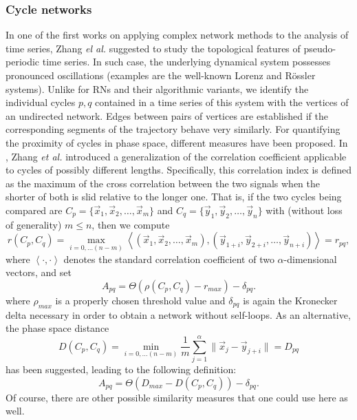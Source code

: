 		\subsubsection{Cycle networks}
In one of the first works on applying complex network methods to the analysis of time series, Zhang {\textit{el al.}} \cite{Zhang2006} suggested to study the topological features of pseudo-periodic time series. In such case, the underlying dynamical system possesses pronounced oscillations (examples are the well-known Lorenz and R\"ossler systems). Unlike for RNs and their algorithmic variants, we identify the individual cycles $p,q$ contained in a time series of this system with the vertices of an undirected network. Edges between pairs of vertices are established if the corresponding segments of the trajectory behave very similarly. For quantifying the proximity of cycles in phase space, different measures have been proposed. In \cite{Zhang2006b}, Zhang {\textit {et al.}} introduced a generalization of the correlation coefficient applicable to cycles of possibly different lengths. Specifically, this correlation index is defined as the maximum of the cross correlation between the two signals when the shorter of both is slid relative to the longer one. That is, if the two cycles being compared are $C_p=\{\vec{x}_1,\vec{x}_2,\ldots,\vec{x}_m\}$ and $C_q=\{\vec{y}_1,\vec{y}_2,\ldots,\vec{y}_n\}$ with (without loss of generality) $m \leq n$, then we compute
\begin{equation}
r(C_p,C_q)=\max_{i=0,\ldots (n-m)} \left<(\vec{x}_1,\vec{x}_2,\ldots,\vec{x}_m),(\vec{y}_{1+i},\vec{y}_{2+i},\ldots, \vec{y}_{n+i})\right> = r_{pq},
\label{cyclecorr}
\end{equation}
where $\left<\cdot,\cdot\right>$ denotes the standard correlation coefficient of two $\alpha$-dimensional vectors, and set
\begin{equation}
A_{pq}=\Theta(\rho(C_p,C_q) - r_{max})-\delta_{pq}.
\end{equation}
where $\rho_{max}$ is a properly chosen threshold value and $\delta_{pq}$ is again the Kronecker delta necessary in order to obtain a network without self-loops. As an alternative, the phase space distance~\cite{Zhang2006b}
\begin{equation}
D(C_p,C_q)=\min_{i=0,\ldots (n-m)} \frac{1}{m} \sum_{j=1}^{\alpha} \|\vec{x}_j-\vec{y}_{j+i}\| = D_{pq}
\label{psd}
\end{equation}
has been suggested, leading to the following definition:
\begin{equation}
A_{pq}=\Theta(D_{max}-D(C_p,C_q))-\delta_{pq}.
\end{equation}
\noindent
Of course, there are other possible similarity measures that one could use here as well.

